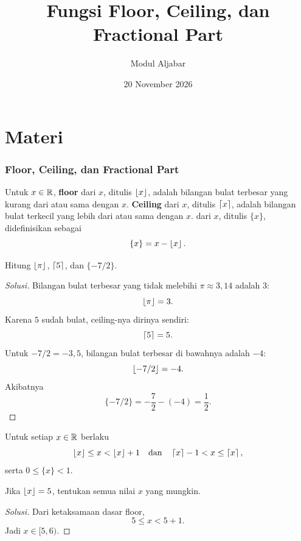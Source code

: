 \documentclass[12pt]{scrartcl}
\title{Fungsi Floor, Ceiling, dan Fractional Part}
\subtitle{Modul Aljabar}
\date{20 November 2026}
\begin{document}
\maketitle

\renewcommand*\contentsname{Daftar Isi}
\tableofcontents

\newpage

\part*{Materi}
\section{Floor, Ceiling, dan Fractional Part}

\begin{definition}
Untuk $x \in \mathbb R$, \textbf{floor} dari $x$, ditulis $\left\lfloor x \right\rfloor$,
adalah bilangan bulat terbesar yang kurang dari atau sama dengan $x$.
\textbf{Ceiling} dari $x$, ditulis $\left\lceil x \right\rceil$,
adalah bilangan bulat terkecil yang lebih dari atau sama dengan $x$.
 dari $x$, ditulis $\{x\}$,
didefinisikan sebagai
\[ \{x\} = x - \left\lfloor x \right\rfloor. \]
\end{definition}

\begin{example}
Hitung $\left\lfloor \pi \right\rfloor$, $\left\lceil 5 \right\rceil$, dan $\{-7/2\}$.
\end{example}
\begin{proof}[Solusi]
Bilangan bulat terbesar yang tidak melebihi $\pi \approx 3{,}14$ adalah $3$:
\[ \left\lfloor \pi \right\rfloor = 3. \]
Karena $5$ sudah bulat, ceiling-nya dirinya sendiri:
\[ \left\lceil 5 \right\rceil = 5. \]
Untuk $-7/2 = -3{,}5$, bilangan bulat terbesar di bawahnya adalah $-4$:
\[ \left\lfloor -7/2 \right\rfloor = -4. \]
Akibatnya
\[ \{-7/2\} = -\frac{7}{2} - (-4) = \frac{1}{2}. \]
\end{proof}

\begin{fact}
Untuk setiap $x \in \mathbb R$ berlaku
\[ \left\lfloor x \right\rfloor \le x < \left\lfloor x \right\rfloor + 1
\quad\text{dan}\quad
\left\lceil x \right\rceil - 1 < x \le \left\lceil x \right\rceil, \]
serta $0 \le \{x\} < 1$.
\end{fact}

\begin{example}
Jika $\left\lfloor x \right\rfloor = 5$, tentukan semua nilai $x$ yang mungkin.
\end{example}
\begin{proof}[Solusi]
Dari ketaksamaan dasar floor,
\[ 5 \le x < 5 + 1. \]
Jadi $x \in [5, 6)$.
\end{proof}
\end{document}
